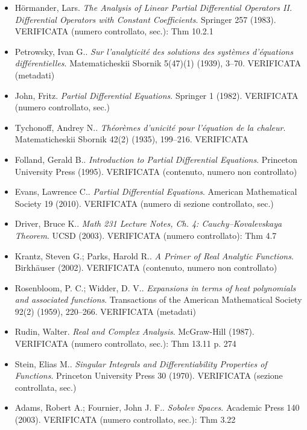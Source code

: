 \documentclass[11pt]{article}
\theoremstyle{plain}
\theoremstyle{definition}
\theoremstyle{remark}
\begin{document}
\begin{itemize}[itemsep=2pt,leftmargin=1.2em,font=\small]
\item H{\"o}rmander, Lars. \emph{The Analysis of Linear Partial Differential Operators {II}. Differential Operators with Constant Coefficients}. Springer 257 (1983). \textsf{\footnotesize VERIFICATA (numero controllato, sec.): Thm 10.2.1}
\item Petrowsky, Ivan G.. \emph{Sur l'analyticit{\'e} des solutions des syst{\`e}mes d'{\'e}quations diff{\'e}rentielles}. Matematicheskii Sbornik 5(47)(1) (1939), 3--70. \textsf{\footnotesize VERIFICATA (metadati)}
\item John, Fritz. \emph{Partial Differential Equations}. Springer 1 (1982). \textsf{\footnotesize VERIFICATA (numero controllato, sec.)}
\item Tychonoff, Andrey N.. \emph{Th{\'e}or{\`e}mes d'unicit{\'e} pour l'{\'e}quation de la chaleur}. Matematicheskii Sbornik 42(2) (1935), 199--216. \textsf{\footnotesize VERIFICATA}
\item Folland, Gerald B.. \emph{Introduction to Partial Differential Equations}. Princeton University Press (1995). \textsf{\footnotesize VERIFICATA (contenuto, numero non controllato)}
\item Evans, Lawrence C.. \emph{Partial Differential Equations}. American Mathematical Society 19 (2010). \textsf{\footnotesize VERIFICATA (numero di sezione controllato, sec.)}
\item Driver, Bruce K.. \emph{Math 231 Lecture Notes, Ch. 4: Cauchy--Kovalevskaya Theorem}. UCSD (2003). \textsf{\footnotesize VERIFICATA (numero controllato): Thm 4.7}
\item Krantz, Steven G.; Parks, Harold R.. \emph{A Primer of Real Analytic Functions}. Birkh{\"a}user (2002). \textsf{\footnotesize VERIFICATA (contenuto, numero non controllato)}
\item Rosenbloom, P. C.; Widder, D. V.. \emph{Expansions in terms of heat polynomials and associated functions}. Transactions of the American Mathematical Society 92(2) (1959), 220--266. \textsf{\footnotesize VERIFICATA (metadati)}
\item Rudin, Walter. \emph{Real and Complex Analysis}. McGraw-Hill (1987). \textsf{\footnotesize VERIFICATA (numero controllato, sec.): Thm 13.11 p. 274}
\item Stein, Elias M.. \emph{Singular Integrals and Differentiability Properties of Functions}. Princeton University Press 30 (1970). \textsf{\footnotesize VERIFICATA (sezione controllata, sec.)}
\item Adams, Robert A.; Fournier, John J. F.. \emph{Sobolev Spaces}. Academic Press 140 (2003). \textsf{\footnotesize VERIFICATA (numero controllato, sec.): Thm 3.22}

\end{itemize}
\end{document}
